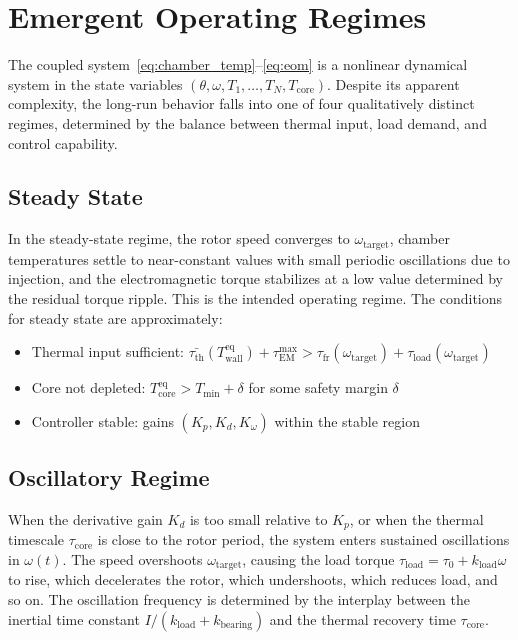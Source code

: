 \documentclass[11pt, a4paper]{article}
\theoremstyle{plain}
\theoremstyle{definition}
\newcommand{\Twall}{T_{\mathrm{wall}}}
\newcommand{\Tcore}{T_{\mathrm{core}}}
\newcommand{\tauEM}{\tau_{\mathrm{EM}}}
\newcommand{\tauth}{\tau_{\mathrm{th}}}
\newcommand{\taufr}{\tau_{\mathrm{fr}}}
\newcommand{\tauload}{\tau_{\mathrm{load}}}
\newcommand{\om}{\omega}
\newcommand{\Nch}{N}
\begin{document}
\section{Emergent Operating Regimes}
\label{sec:regimes}

The coupled system~\eqref{eq:chamber_temp}--\eqref{eq:eom} is a nonlinear dynamical system in the state variables $(\theta, \om, T_1, \ldots, T_\Nch, \Tcore)$. Despite its apparent complexity, the long-run behavior falls into one of four qualitatively distinct regimes, determined by the balance between thermal input, load demand, and control capability.

\subsection{Steady State}

In the steady-state regime, the rotor speed converges to $\om_{\mathrm{target}}$, chamber temperatures settle to near-constant values with small periodic oscillations due to injection, and the electromagnetic torque stabilizes at a low value determined by the residual torque ripple. This is the intended operating regime. The conditions for steady state are approximately:
\begin{itemize}
  \item Thermal input sufficient: $\bar{\tauth}(\Twall^{\mathrm{eq}}) + \tauEM^{\mathrm{max}} > \taufr(\om_{\mathrm{target}}) + \tauload(\om_{\mathrm{target}})$
  \item Core not depleted: $\Tcore^{\mathrm{eq}} > T_{\mathrm{min}} + \delta$ for some safety margin $\delta$
  \item Controller stable: gains $(K_p, K_d, K_\om)$ within the stable region
\end{itemize}

\subsection{Oscillatory Regime}

When the derivative gain $K_d$ is too small relative to $K_p$, or when the thermal timescale $\tau_{\mathrm{core}}$ is close to the rotor period, the system enters sustained oscillations in $\om(t)$. The speed overshoots $\om_{\mathrm{target}}$, causing the load torque $\tauload = \tau_0 + k_{\mathrm{load}}\om$ to rise, which decelerates the rotor, which undershoots, which reduces load, and so on. The oscillation frequency is determined by the interplay between the inertial time constant $I/(k_{\mathrm{load}} + k_{\mathrm{bearing}})$ and the thermal recovery time $\tau_{\mathrm{core}}$.
\end{document}
